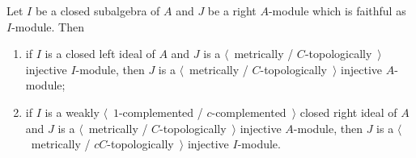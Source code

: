 \begin{proposition}\label{MetTopInjUnderChangeOfAlg} Let $I$ be a closed
subalgebra of $A$ and $J$ be a right $A$-module which is faithful as $I$-module.
Then

\begin{enumerate}[label = (\roman*)]
    \item if $I$ is a closed left ideal of $A$ and $J$ is a $\langle$~metrically /
    $C$-topologically~$\rangle$  injective $I$-module, then $J$ is a 
    $\langle$~metrically / $C$-topologically~$\rangle$ injective $A$-module;

    \item if $I$ is a weakly $\langle$~$1$-complemented /
    $c$-complemented~$\rangle$ closed right ideal of $A$ and $J$ is a
    $\langle$~metrically / $C$-topologically~$\rangle$ injective $A$-module,
    then $J$ is a $\langle$~metrically / $cC$-topologically~$\rangle$ injective
    $I$-module.
\end{enumerate}
\end{proposition}
